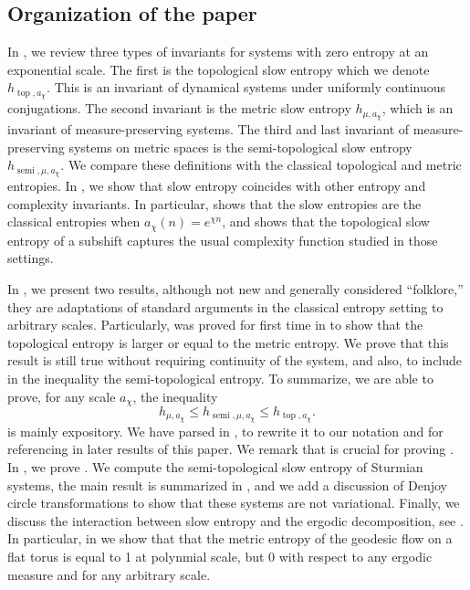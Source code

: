 \documentclass[oneside]{amsart}
\theoremstyle{plain}
\theoremstyle{definition}
\newcommand{\<}{\langle}
\renewcommand{\>}{\rangle}
\newcommand{\topo}{\operatorname{top}}
\renewcommand{\|}{|\!|} %
\newcommand{\semitop}{\operatorname{semi}} %
\begin{document}
\subsection{Organization of the paper} 
In , we review three types of invariants for systems with zero entropy at an exponential scale. The first is the topological slow entropy which we denote $h_{\topo,a_\chi}$. This is an invariant of dynamical systems under uniformly continuous conjugations. The second invariant is the metric slow entropy $h_{\mu,a_\chi}$, which is an invariant of measure-preserving systems. The third and last invariant of measure-preserving systems on metric spaces is the semi-topological slow entropy $h_{\semitop,\mu,a_\chi}$. We compare these definitions with the classical topological and metric entropies. In , we show that slow entropy coincides with other entropy and complexity invariants. In particular,  shows that the slow entropies are the classical entropies when $a_{\chi}(n) = e^{\chi n}$, and  shows that the topological slow entropy of a subshift captures the usual complexity function studied in those settings.

In , we present two results, although not new and generally considered ``folklore,'' they are adaptations of standard arguments in the classical entropy setting to arbitrary scales. Particularly,  was proved for first time in \cite{goodwyn} to show that the topological entropy is larger or equal to the metric entropy. We prove that this result is still true without requiring continuity of the system, and also, to include in the inequality the semi-topological entropy. To summarize, we are able to prove, for any scale $a_\chi$, the inequality
\begin{equation*}
    h_{\mu,a_\chi} \leq h_{\semitop,\mu,a_\chi} \leq h_{\topo,a_\chi}.
\end{equation*}
 is mainly expository. We have parsed \cite[Proposition 3]{Ferenczi0} in , to rewrite it to our notation and for referencing in later results of this paper. We remark that is crucial for proving . In 
, we prove  . We compute the semi-topological slow entropy of Sturmian systems, the main result is summarized in , and we add a discussion of Denjoy circle transformations to show that these systems are not variational. 
Finally, we discuss the interaction between slow entropy and the ergodic decomposition, see . In particular, in  we show that that the metric entropy of the geodesic flow on a flat torus is equal to 1 at polynmial scale, but 0 with respect to any ergodic measure and for any arbitrary scale.
\end{document}
